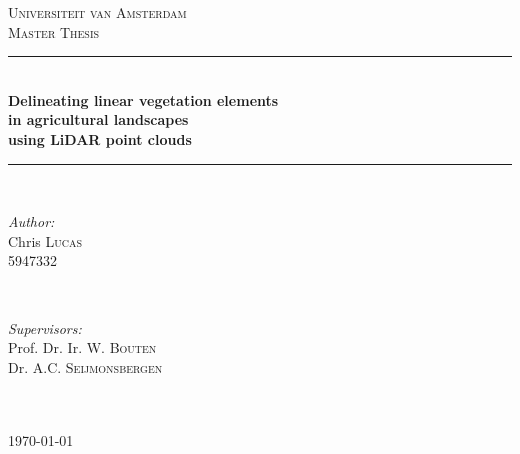 \begin{titlepage}
	\newcommand{\HRule}{\rule{\linewidth}{0.5mm}} %
	
	\center %
	
	\textsc{\LARGE Universiteit van Amsterdam}\\[1.5cm] %

	\textsc{\large Master Thesis}\\[0.5cm] %
	
	\HRule \\[0.4cm]
	{ \Large \bfseries Delineating linear vegetation elements\\in agricultural landscapes\\[0.2cm]using LiDAR point clouds}\\[0.4cm] %
	\HRule \\[1.5cm]
	
	\begin{minipage}{0.45\textwidth}
		\begin{flushleft} \large
			\emph{Author:}\\
			Chris \textsc{Lucas}\\ %
			5947332\\
		\end{flushleft}
	\end{minipage}
	~
	\begin{minipage}{0.45\textwidth}
		\begin{flushright} \large
			\emph{Supervisors:} \\
			Prof. Dr. Ir. W. \textsc{Bouten}\\
			Dr. A.C. \textsc{Seijmonsbergen}\\ %
			\
		\end{flushright}
	\end{minipage}\\[4cm]
	
	{\large \today}\\[3cm] %
	
	\vfill %
\end{titlepage}